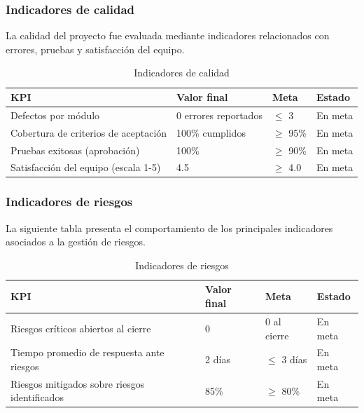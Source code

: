 \documentclass[11pt,spanish]{article}
\begin{document}
\subsubsection{Indicadores de calidad}

La calidad del proyecto fue evaluada mediante indicadores relacionados con
errores, pruebas y satisfacción del equipo.

\begin{table}[H]
\centering
\caption{Indicadores de calidad}
\label{tab:kpi-calidad}
\begin{tabularx}{\textwidth}{Yp{3cm}p{2.5cm}p{2.5cm}}
\toprule
\textbf{KPI} &
\textbf{Valor final} &
\textbf{Meta} &
\textbf{Estado} \\
\midrule

Defectos por módulo &
0 errores reportados &
$\leq$ 3 &
En meta
\\

Cobertura de criterios de aceptación &
100\% cumplidos &
$\geq$ 95\% &
En meta
\\

Pruebas exitosas (aprobación) &
100\% &
$\geq$ 90\% &
En meta
\\

Satisfacción del equipo (escala 1-5) &
4.5 &
$\geq$ 4.0 &
En meta
\\

\bottomrule
\end{tabularx}
\end{table}

\subsubsection{Indicadores de riesgos}

La siguiente tabla presenta el comportamiento de los principales indicadores
asociados a la gestión de riesgos.

\begin{table}[H]
\centering
\caption{Indicadores de riesgos}
\label{tab:kpi-riesgos}
\begin{tabularx}{\textwidth}{Yp{3cm}p{2.5cm}p{2.5cm}}
\toprule
\textbf{KPI} &
\textbf{Valor final} &
\textbf{Meta} &
\textbf{Estado} \\
\midrule

Riesgos críticos abiertos al cierre &
0 &
0 al cierre &
En meta
\\

Tiempo promedio de respuesta ante riesgos &
2 días &
$\leq$ 3 días &
En meta
\\

Riesgos mitigados sobre riesgos identificados &
85\% &
$\geq$ 80\% &
En meta
\\

\bottomrule
\end{tabularx}
\end{table}
\end{document}
